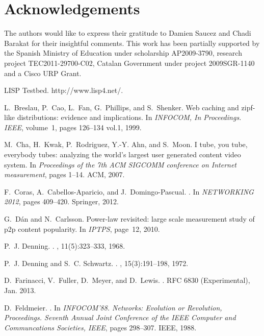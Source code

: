\documentclass[twocolumn, 10pt]{article}
\theoremstyle{plain}
\begin{document}
\section*{Acknowledgements} 
The authors would like to express their gratitude to Damien Saucez and Chadi
Barakat for their insightful comments. This work has been partially supported
by the Spanish Ministry of Education under scholarship AP2009-3790, research
project TEC2011-29700-C02, Catalan Government under project 2009SGR-1140 and a
Cisco URP Grant.

\small
\begin{thebibliography}{10}

{LISP Testbed}.
\newblock http://www.lisp4.net/.

L.~Breslau, P.~Cao, L.~Fan, G.~Phillips, and S.~Shenker.
\newblock Web caching and zipf-like distributions: evidence and implications.
\newblock In {\em INFOCOM, In Proceedings. IEEE}, volume~1, pages 126--134
  vol.1, 1999.

M.~Cha, H.~Kwak, P.~Rodriguez, Y.-Y. Ahn, and S.~Moon.
\newblock I tube, you tube, everybody tubes: analyzing the world's largest user
  generated content video system.
\newblock In {\em Proceedings of the 7th ACM SIGCOMM conference on Internet
  measurement}, pages 1--14. ACM, 2007.

F.~Coras, A.~Cabellos-Aparicio, and J.~Domingo-Pascual.
.
\newblock In {\em NETWORKING 2012}, pages 409--420. Springer, 2012.

G.~D{\'a}n and N.~Carlsson.
\newblock Power-law revisited: large scale measurement study of p2p content
  popularity.
\newblock In {\em IPTPS}, page~12, 2010.

P.~J. Denning.
.
, 11(5):323--333, 1968.

P.~J. Denning and S.~C. Schwartz.
.
, 15(3):191--198, 1972.

D.~Farinacci, V.~Fuller, D.~Meyer, and D.~Lewis.
.
\newblock RFC 6830 (Experimental), Jan. 2013.

D.~Feldmeier.
.
\newblock In {\em INFOCOM'88. Networks: Evolution or Revolution, Proceedings.
  Seventh Annual Joint Conference of the IEEE Computer and Communcations
  Societies, IEEE}, pages 298--307. IEEE, 1988.


\end{thebibliography}
\end{document}
